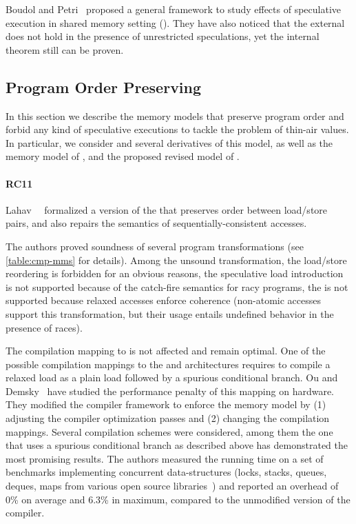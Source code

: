 Boudol and Petri~\cite{Boudol-Petri:ESOP10} proposed a general 
framework to study effects of speculative execution in
shared memory setting (\TSC). 
They have also noticed that the external \DRF does not 
hold in the presence of unrestricted speculations, 
yet the internal \DRF theorem still can be proven. 

\subsection{Program Order Preserving}
\label{sec:catalog:porf}

In this section we describe the memory models 
that preserve program order and forbid any 
kind of speculative executions to tackle 
the problem of thin-air values. 
In particular, we consider \RCMM and 
several derivatives of this model, 
as well as the memory model of \OCaml, 
and the proposed revised model of \Java.  

\paragraph{RC11}

Lahav~\etal~\cite{Lahav-al:PLDI17} formalized 
a version of the \CMM that preserves order between load/store pairs, 
and also repairs the semantics of sequentially-consistent accesses.

The authors proved soundness of several program transformations 
(see \cref{table:cmp-mms} for details). 
Among the unsound transformation, 
the load/store reordering is forbidden for an obvious reasons, 
the speculative load introduction is not supported 
because of the catch-fire semantics for racy programs, 
the \CSE is not supported because relaxed accesses 
enforce coherence (non-atomic accesses 
support this transformation, but their usage entails 
undefined behavior in the presence of races).

The compilation mapping to \Intel is not affected and remain optimal.
One of the possible compilation mappings 
to the \ARM and \POWER architectures 
requires to compile a relaxed load as  
a plain load followed by a spurious conditional branch.
Ou and Demsky~\cite{Ou-Demsky:OOPSLA18} have studied 
the performance penalty of this mapping on  hardware.
They modified the \LLVM compiler framework 
to enforce the \RCMM memory model
by (1) adjusting the compiler optimization passes and 
(2) changing the compilation mappings.
Several compilation schemes were considered,
among them the one that uses a spurious conditional branch
as described above has demonstrated the most promising results.  
The authors measured the running time on a set of benchmarks 
implementing concurrent data-structures
(\eg locks, stacks, queues, deques, maps
from various open source libraries~\cite{CDSLib, FollyLib, JunctionLib})
and reported an overhead of 0\% on average and 6.3\% in maximum,
compared to the unmodified version of the compiler. 

